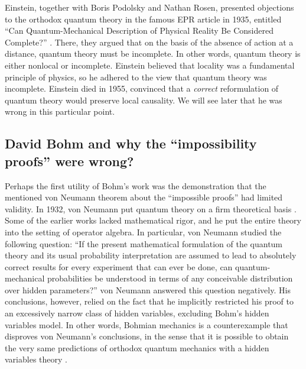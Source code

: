 \documentclass[nofootinbib, secnumarabic, amsmath, nobibnotes,11pt,aps,pra, floatfix]{revtex4-1}
\begin{document}
Einstein, together with Boris Podolsky and Nathan Rosen, presented
objections to the orthodox quantum theory in the famous EPR article in 1935,
entitled ``Can Quantum-Mechanical Description of Physical Reality Be
Considered Complete?'' \cite{om.Einstein_rosen1935}. There, they
argued that on the basis of the absence of action at a distance,
quantum theory must be incomplete. In other words, quantum theory is
either nonlocal or incomplete. Einstein believed that locality was a
fundamental principle of physics, so he adhered to the view that
quantum theory was incomplete. Einstein died in 1955, convinced that
a \textit{correct} reformulation of quantum theory would preserve
local causality. We will see later that he was wrong in this particular point.  


\subsection{David Bohm and why the ``impossibility proofs'' were wrong?}\label{om.sec_intro.7}

Perhaps the first utility of Bohm's work was the demonstration that the mentioned von Neumann theorem about the ``impossible proofs'' had limited validity. In 1932, von Neumann put quantum theory on a firm theoretical basis \cite{om.impossibility_proofs}. Some of the earlier works lacked mathematical rigor, and he put the entire theory into the setting of operator algebra. In particular,  von Neumann studied the following question: ``If the present mathematical formulation of the quantum theory and its usual probability interpretation are assumed to lead to absolutely correct results for every experiment that can ever be done, can quantum-mechanical probabilities be understood in terms of any conceivable distribution over hidden parameters?'' von Neumann answered this question negatively.
His conclusions, however, relied on the fact that he implicitly restricted his proof to an excessively narrow class of hidden variables, excluding Bohm's hidden variables model.
In other words, Bohmian mechanics is a counterexample that disproves von Neumann's conclusions, in the sense that it is possible to obtain the very same predictions of orthodox quantum mechanics with a hidden variables theory \cite{om.Holand1993,om.Bell1987}.
\end{document}
